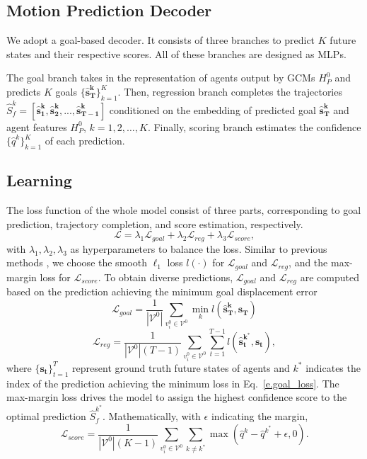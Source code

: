 \documentclass[letterpaper, 10 pt, conference]{ieeeconf}
\begin{document}
\subsection{Motion Prediction Decoder}
\label{sec,pred}
We adopt a goal-based decoder. It consists of three branches to predict $K$ future states and their respective scores.  All of these branches are designed as MLPs. 

The goal branch takes in the representation of agents output by GCMs $H_{P}^0$ and predicts $K$ goals $\{\bm{\hat{s}_T^{k}} \}_{k=1}^K$. Then, regression branch completes the trajectories $\hat{S}_f^{k}= \left[\bm{\hat{s}_{1}^{k}}, \bm{\hat{s}_{2}^{k}},...,\bm{\hat{s}_{T-1}^{k}} \right]$ conditioned on the embedding of  predicted goal $\bm{\hat{s}_{T}^{k}}$ and agent features $H_P^0$, $k=1, 2, \dots, K$. 
Finally, scoring branch estimates the confidence $\{\hat{q}^{k} \}_{k=1}^K$ of each prediction. 

\subsection{Learning}\label{sec.learn}
The loss function of the whole model consist of three parts, corresponding to goal prediction, trajectory completion, and score estimation, respectively.
\begin{equation}
    \mathcal{L}=  \lambda_1 \mathcal{L}_{goal} + \lambda_2  \mathcal{L}_{reg} + \lambda_3  \mathcal{L}_{score},
\end{equation}
with $\lambda_1, \lambda_2, \lambda_3$ as hyperparameters to balance the loss. Similar to previous methods \cite{liang2020learning,zeng2021lanercnn}, we choose the smooth $\ell_1$ loss  $l(\cdot)$ for $\mathcal{L}_{goal}$ and $\mathcal{L}_{reg}$, and the max-margin loss for $\mathcal{L}_{score}$. To obtain diverse predictions, $\mathcal{L}_{goal}$ and $\mathcal{L}_{reg}$ are computed based on the prediction achieving the minimum goal displacement error
\begin{equation}
       \mathcal{L}_{goal}= \frac{1}{|\mathcal{V}^0|} \sum_{v_i^0 \in \mathcal{V}^0}\min_{k}l(\bm{\hat{s}_{T}^{k},\bm{s_{T}} }) \label{e.goal_loss}
\end{equation}
\begin{equation}
     \mathcal{L}_{reg}= \frac{1}{|\mathcal{V}^0|(T-1)} \sum_{v_i^0 \in \mathcal{V}^0} \sum_{t=1}^{T-1} l(\bm{\hat{s}_{t}^{k^*},\bm{s_{t}}}),
\end{equation}
where $\{\bm{s_t}\}_{t=1}^T$ represent ground truth future states of agents and  $k^*$ indicates the index of the prediction achieving the minimum loss in Eq.~\eqref{e.goal_loss}.  The max-margin loss drives the model to assign the highest confidence score to the optimal prediction $\hat{S}_f^{k^*}$. Mathematically, with $\epsilon$ indicating the margin,
\begin{equation}
    \mathcal{L}_{score}= \frac{1}{|\mathcal{V}^0|(K-1)} \sum_{v_i^0 \in \mathcal{V}^0} \sum_{k \neq k^*} \max(\hat{q}^{k}-\hat{q}^{k^*} + \epsilon, 0).
\end{equation}
\end{document}

